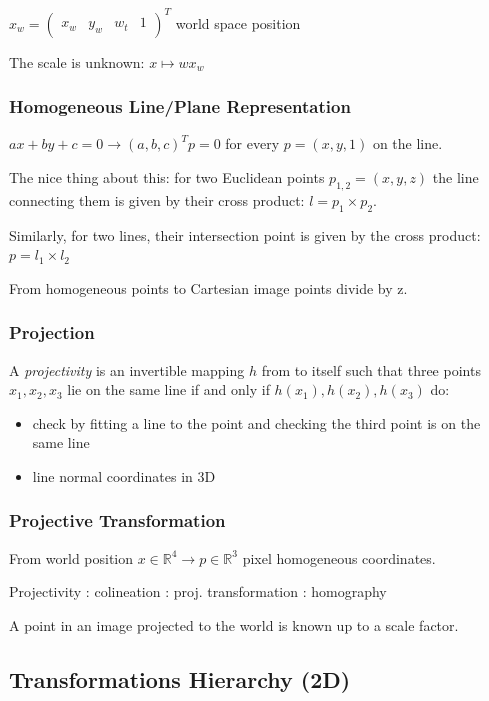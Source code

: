 $ x_w = \left( \begin{matrix} x_w &  y_w & w_t & 1 \end{matrix} \right)^T $ world space position

The scale is unknown: $x \mapsto  w x_w$

\subsubsection{Homogeneous Line/Plane Representation}

$ax+by+c = 0 \to (a,b,c)^T p = 0$ for every $p = (x,y,1)$ on the line.

The nice thing about this: for two Euclidean points $p_{1,2} = (x,y,z) $ the line connecting them is given by their cross product: $l = p_1 \times p_2$. 

Similarly, for two lines, their intersection point is given by the cross product: 
$p = l_1 \times l_2$

From homogeneous points to Cartesian image points divide by z. 


\subsubsection{Projection}

A \emph{projectivity} is an invertible mapping $h$ from  to itself such that three points $x_1 , x_2 , x_3$ lie on the same line if and only if $h(x_1), h(x_2 ), h(x_3)$ do:
%
\begin{itemize}
\item check by fitting a line to the point and checking the third point is on the same line
\item line normal coordinates in 3D
\end{itemize}

\subsubsection{Projective Transformation}

From world position $x \in \mathbb{R}^4 \to p \in \mathbb R^3$ pixel homogeneous coordinates. 

Projectivity : colineation :  proj. transformation : homography

A point in an image projected to the world is known up to a scale factor.

\subsection{Transformations Hierarchy (2D)}

